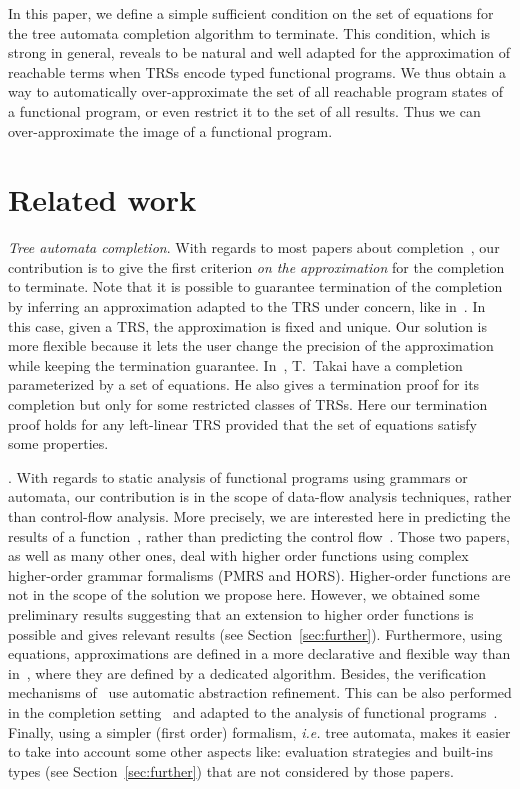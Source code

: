 \documentclass[a4paper,11pt]{llncs}
\theoremstyle{plain}
\begin{document}
\noindent
In this paper, we define a simple
sufficient condition on the set of equations for the 
tree automata completion algorithm to terminate. This condition, which is strong
in general, reveals to be natural and well adapted for the approximation of
reachable terms when TRSs encode typed functional programs. We thus obtain a way to automatically
over-approximate the set of all reachable program states of a functional 
program, or even restrict it to the set of all results. Thus we can
over-approximate the image of a functional program.

\section{Related work}


{\em Tree automata completion}. 
With regards to most papers about
completion~\cite{Genet-RTA98,Takai-RTA04,FeuilladeGVTT-JAR04,BoichutCHK-IJFCS09,GenetR-JSC10,Lisitsa-RTA12},
our contribution is to give the first criterion {\em on the approximation} for the
completion to terminate. Note that it is possible to guarantee termination of
the completion by inferring an approximation adapted to the TRS under
concern, like in~\cite{OehlCKS-FASE03}. In this case, given a TRS, the approximation is
fixed and unique. Our solution is more flexible because it lets the user change
the precision of the approximation while keeping the termination
guarantee. In~\cite{Takai-RTA04}, T.~Takai have a completion parameterized by a
set of equations. He also gives a termination proof for its completion but only
for some restricted classes of TRSs. Here our termination proof holds for any 
left-linear TRS provided that the set of equations satisfy some properties.

\medskip
{}.  With regards to static
analysis of functional programs using grammars or automata, our contribution is
in the scope of data-flow analysis techniques, rather than control-flow
analysis. More precisely, we are interested here in predicting the results of a
function~\cite{OngR-POPL11}, rather than predicting the control
flow~\cite{Kobayashi-JACM13}. Those two papers, as well 
as many other ones, deal with higher order functions using complex higher-order
grammar formalisms (PMRS 
and HORS). Higher-order functions are not in the scope of the solution we
propose here. However, we obtained some preliminary results suggesting that an
extension to higher order functions is possible and gives relevant results (see
Section~\ref{sec:further}). Furthermore, using equations, approximations are
defined in a more declarative and flexible way than in~\cite{OngR-POPL11}, where
they are defined by a dedicated algorithm. Besides, the verification mechanisms
of~\cite{OngR-POPL11} use automatic abstraction refinement. This can be also
performed in the completion setting~\cite{BoichutBGL-ICFEM12} and adapted to
the analysis of functional programs~\cite{GenetS-rep13}. Finally, using a simpler
(first order) formalism, {\em i.e.} tree automata, makes it easier to take into
account some other aspects like: evaluation strategies and built-ins types (see
Section~\ref{sec:further}) that are not considered by those papers.
\end{document}
